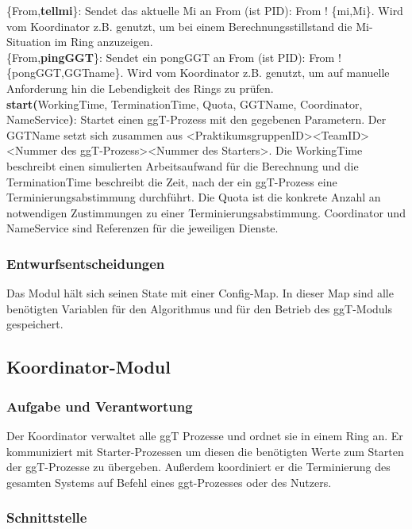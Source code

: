 \documentclass{article}
\begin{document}
\{From,\textbf{tellmi}\}: Sendet das aktuelle Mi an From (ist PID): From ! \{mi,Mi\}. Wird vom Koordinator z.B. genutzt,
um bei einem Berechnungsstillstand die Mi-Situation im Ring anzuzeigen.\\

\{From,\textbf{pingGGT}\}: Sendet ein pongGGT an From (ist PID): From ! \{pongGGT,GGTname\}. Wird vom Koordinator z.B.
genutzt, um auf manuelle Anforderung hin die Lebendigkeit des Rings zu prüfen.\\


\textbf{start(}WorkingTime, TerminationTime, Quota, GGTName, Coordinator, NameService\textbf{)}: Startet einen
ggT-Prozess mit den gegebenen Parametern. Der GGTName setzt sich zusammen aus <PraktikumsgruppenID><TeamID><Nummer des ggT-Prozess><Nummer des Starters>.
Die WorkingTime beschreibt einen simulierten Arbeitsaufwand für die Berechnung und die TerminationTime beschreibt die
Zeit, nach der ein ggT-Prozess eine Terminierungsabstimmung durchführt. Die Quota ist die konkrete Anzahl an
notwendigen Zustimmungen zu einer Terminierungsabstimmung. Coordinator und NameService sind Referenzen für die
jeweiligen Dienste.\\

\subsubsection{Entwurfsentscheidungen}
Das Modul hält sich seinen State mit einer Config-Map. In dieser Map sind alle benötigten Variablen für den Algorithmus
und für den Betrieb des ggT-Moduls gespeichert.

\newpage

\subsection{Koordinator-Modul}
\subsubsection{Aufgabe und Verantwortung}
Der Koordinator verwaltet alle ggT Prozesse und ordnet sie in einem Ring an. Er kommuniziert mit Starter-Prozessen
um diesen die benötigten Werte zum Starten der ggT-Prozesse zu übergeben. Außerdem koordiniert er die Terminierung des
gesamten Systems auf Befehl eines ggt-Prozesses oder des Nutzers.

\subsubsection{Schnittstelle}
\end{document}
